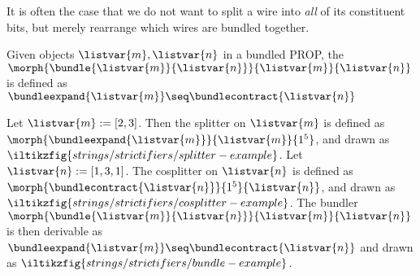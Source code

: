 It is often the case that we do not want to split a wire into \emph{all} of its
constituent bits, but merely rearrange which wires are bundled together.

\begin{definition}[Bundler]
    Given objects \(\listvar{m},\listvar{n}\) in a bundled PROP, the
    \(\morph{\bundle{\listvar{m}}{\listvar{n}}}{\listvar{m}}{\listvar{n}}\) is
    defined as \(
        \bundleexpand{\listvar{m}} \seq \bundlecontract{\listvar{n}}
    \)
\end{definition}


\begin{example}
    Let \(\listvar{m} := [2, 3]\).
    Then the splitter on \(\listvar{m}\) is defined as \(
        \morph{\bundleexpand{\listvar{m}}}{\listvar{m}}{1^5}
    \), and drawn as \(
        \iltikzfig{strings/strictifiers/splitter-example}
    \).
    Let \(\listvar{n} := [1,3,1]\).
    The cosplitter on \(\listvar{n}\) is defined as \(
        \morph{\bundlecontract{\listvar{n}}}{1^5}{\listvar{n}}
    \), and drawn as \(
        \iltikzfig{strings/strictifiers/cosplitter-example}
    \).
    The bundler \(\morph{\bundle{\listvar{m}}{\listvar{n}}}{\listvar{m}}{\listvar{n}}\)
    is then derivable as \(\bundleexpand{\listvar{m}} \seq \bundlecontract{\listvar{n}}\)
    and drawn as \(
        \iltikzfig{strings/strictifiers/bundle-example}
    \).
\end{example}